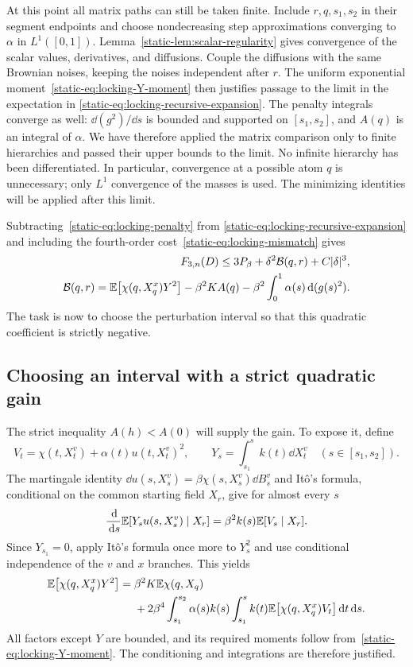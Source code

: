 At this point all matrix paths can still be taken finite. Include
$r,q,s_1,s_2$ in their segment endpoints and choose nondecreasing step
approximations converging to $\alpha$ in $L^1([0,1])$.
Lemma~\ref{static-lem:scalar-regularity} gives convergence of the scalar
values, derivatives, and diffusions. Couple the diffusions with the
same Brownian noises, keeping the noises independent after $r$.
The uniform exponential moment~\eqref{static-eq:locking-Y-moment}
then justifies passage to the limit in the expectation in
\eqref{static-eq:locking-recursive-expansion}. The penalty integrals
converge as well: $\dd(g^2)/\dd s$ is bounded and supported on
$[s_1,s_2]$, and $A(q)$ is an integral of $\alpha$.
We have therefore applied the matrix comparison only to finite
hierarchies and passed their upper bounds to the limit. No infinite
hierarchy has been differentiated. In particular, convergence at a
possible atom $q$ is unnecessary; only $L^1$ convergence of the
masses is used. The minimizing identities will be applied after this
limit.

Subtracting~\eqref{static-eq:locking-penalty} from
\eqref{static-eq:locking-recursive-expansion} and including the
fourth-order cost~\eqref{static-eq:locking-mismatch} gives
\begin{equation}
\label{static-eq:locking-three-pressure-expansion}
 \begin{split}
 F_{3,n}(D)\leq 3P_\beta+\delta^2\mathcal B(q,r)+C|\delta|^3,\\
 \mathcal B(q,r)=
 \mathbb E\bigl[\chi(q,X_q^x)Y^2\bigr]
 -\beta^2KA(q)-\beta^2\int_0^1\alpha(s)\,\mathrm d(g(s)^2).
 \end{split}
\end{equation}
The task is now to choose the perturbation interval so that this
quadratic coefficient is strictly negative.

\subsection{Choosing an interval with a strict quadratic gain}

The strict inequality $A(h)<A(0)$ will supply the gain. To expose it,
define
\[
 V_t=\chi(t,X_t^v)+\alpha(t)u(t,X_t^v)^2,
 \qquad Y_s=\int_{s_1}^{s}k(t)\dd X_t^v
 \quad(s\in[s_1,s_2]).
\]
The martingale identity
$\dd u(s,X_s^v)=\beta\chi(s,X_s^v)\dd B_s^v$ and It\^o's formula,
conditional on the common starting field $X_r$, give for almost every
$s$
\[
 \frac{\,\mathrm d}{\,\mathrm d s}\mathbb E[Y_su(s,X_s^v)\mid X_r]
   =\beta^2 k(s)\mathbb E[V_s\mid X_r].
\]
Since $Y_{s_1}=0$, apply It\^o's formula once more to $Y_s^2$ and use
conditional independence of the $v$ and $x$ branches. This yields
\begin{equation}
\label{static-eq:locking-Ito}
 \begin{split}
 \mathbb E\bigl[\chi(q,X_q^x)Y^2\bigr]
 ={}&\beta^2K\mathbb E\chi(q,X_q)\\
 &+2\beta^4\int_{s_1}^{s_2}\alpha(s)k(s)
      \int_{s_1}^{s}k(t)
       \mathbb E\bigl[\chi(q,X_q^x)V_t\bigr]\,\mathrm d t\,\mathrm d s.
 \end{split}
\end{equation}
All factors except $Y$ are bounded, and its required moments follow
from~\eqref{static-eq:locking-Y-moment}. The conditioning and integrations
are therefore justified.


